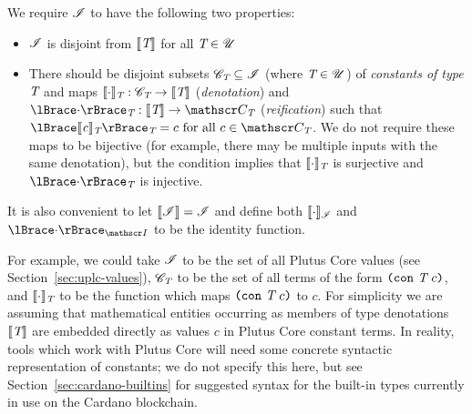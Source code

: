 \medskip
\noindent We require $\mathscr{I}$ to have the following two properties:
\begin{itemize}
\item $\mathscr{I}$ is disjoint from $\llbracket\mathit{\textit{T}}\rrbracket$ for all $\textit{T} \in \mathscr{U}$
\item There should be disjoint subsets $\mathscr{C}_{\textit{T}} \subseteq \mathscr{I}$ (where $\textit{T}
  \in \mathscr{U}$) of \textit{constants of type $\textit{T}$} and maps $\llbracket\mathit{\cdot}\rrbracket_{\textit{T}}:
  \mathscr{C}_{\textit{T}} \rightarrow \llbracket\mathit{\textit{T}}\rrbracket$ (\textit{denotation}) and
  $\reify{\cdot}_{\tn}: \denote{\tn} \rightarrow \Con{\tn}$
  (\textit{reification}) such that $\reify{\denote{c}_{\tn}}_{\tn} = c \text{
    for all } c \in \Con{\tn}$.  We do not require these maps to be bijective
  (for example, there may be multiple inputs with the same denotation), but the
  condition implies that $\llbracket\mathit{\cdot}\rrbracket_{\textit{T}}$ is surjective and
  $\reify{\cdot}_{\tn}$ is injective.
\end{itemize}%
%
%

\noindent It is also convenient to let $\llbracket\mathit{\mathscr{I}}\rrbracket = \mathscr{I}$ and define both
  $\llbracket\mathit{\cdot}\rrbracket_{\mathscr{I}}$ and $\reify{\cdot}_{\Inputs}$ to be the identity
  function.



\noindent For example, we could take $\mathscr{I}$ to be the set of all Plutus Core
values (see Section~\ref{sec:uplc-values}), $\mathscr{C}_{\textit{T}}$ to be the set of all
terms of the form $\texttt{(} \texttt{con} ~ \textit{T} ~ c \texttt{)}$, and $\llbracket\mathit{\cdot}\rrbracket_{\textit{T}}$ to be the function
which maps $\texttt{(} \texttt{con} ~ \textit{T} ~ c \texttt{)}$ to $c$.  For simplicity we are assuming that
mathematical entities occurring as members of type denotations $\llbracket\mathit{\textit{T}}\rrbracket$
are embedded directly as values $c$ in Plutus Core constant terms. In reality,
tools which work with Plutus Core will need some concrete syntactic
representation of constants; we do not specify this here, but see
Section~\ref{sec:cardano-builtins}
for suggested syntax for the built-in types currently in use on the Cardano
blockchain.

